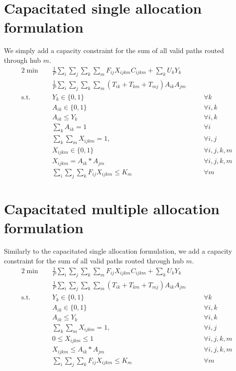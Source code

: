 \documentclass{llncs}
\begin{document}
\section{Capacitated single allocation formulation}	
	We simply add a capacity constraint for the sum of all valid paths routed through hub $m$. 
	\begin{alignat}{2}
		\min\quad
		& \frac{1}{P} \sum_{i}\sum_{j}\sum_{k}\sum_{m}F_{ij}  X_{ijkm} C_{ijkm} + \sum_{k}U_k Y_{k} & & \nonumber\\
		\quad& \frac{1}{P} \sum_{i}\sum_{j}\sum_{k}\sum_{m}{(T_{ik}+ T_{km}+ T_{mj} ) A_{ik} A_{jm}}  & & \tag{LP4}\label{lp4}\\
		\mbox{s.t.}  \quad
		&Y_{k} \in \{0,1\} &\quad& \forall k \label{st3.1}\\ 
		&A_{ik} \in \{0,1\} &\quad& \forall i,k \label{st3.2}\\ 
		&A_{ik} \leq Y_{k} &\quad& \forall i,k \label{st3.3}\\
		&\sum_{k}{A_{ik}} = 1 &\quad& \forall i \label{st3.4}\\
		&\sum_{k}\sum_{m}{X_{ijkm} = 1}, &\quad& \forall i,j \label{st3.5}\\
		&X_{ijkm} \in \{0,1\} &\quad& \forall i,j,k,m \label{st3.6}\\
		&X_{ijkm} = A_{ik} * A_{jm} &\quad& \forall i,j,k,m \label{st3.7} \\
		&\sum_{i}\sum_{j}\sum_{k}{F_{ij}X_{ijkm} \leq K_{m}} &\quad& \forall m \label{st3.8} 
	\end{alignat}

\section{Capacitated multiple allocation formulation}	
Similarly to the capacitated single allocation formulation, we add a capacity constraint for the sum of all valid paths routed through hub $m$.
	\begin{alignat}{2}
		\min\quad
		& \frac{1}{P} \sum_{i}\sum_{j}\sum_{k}\sum_{m}F_{ij}  X_{ijkm} C_{ijkm} + \sum_{k}U_k Y_{k} & & \nonumber\\
		\quad& \frac{1}{P} \sum_{i}\sum_{j}\sum_{k}\sum_{m}{(T_{ik}+ T_{km}+ T_{mj} ) A_{ik} A_{jm}}  & & \tag{LP5}\label{lp5}\\
		\mbox{s.t.}  \quad
		&Y_{k} \in \{0,1\} &\quad& \forall k \label{st4.1}\\ 
		&A_{ik} \in \{0,1\} &\quad& \forall i,k \label{st4.2}\\ 
		&A_{ik} \leq Y_{k} &\quad& \forall i,k \label{st4.3}\\
		&\sum_{k}\sum_{m}{X_{ijkm} = 1}, &\quad& \forall i,j \label{st4.4}\\
		& 0 \leq X_{ijkm} \leq 1 &\quad& \forall i,j,k,m \label{st4.5}\\
		&X_{ijkm} \leq A_{ik} * A_{jm} &\quad& \forall i,j,k,m \label{st4.6} \\
		&\sum_{i}\sum_{j}\sum_{k}{F_{ij}X_{ijkm} \leq K_{m}} &\quad& \forall m \label{st3.8}
	\end{alignat}
\end{document}
